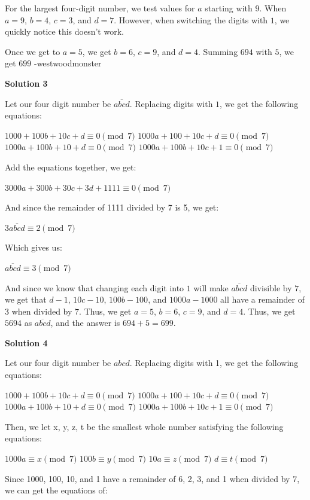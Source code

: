 \begin{enumerate}
 For the largest four-digit number, we test values for $a$ starting with $9$. When $a = 9$, $b = 4$, $c = 3$, and $d = 7$.  However, when switching the digits with $1$, we quickly notice this doesn't work. 

 Once we get to $a = 5$, we get $b=6$, $c=9$, and $d=4$. Summing $694$ with $5$, we get $\boxed{699}$ -westwoodmonster

 



\textbf{Solution 3}

Let our four digit number be $\overline{abcd}$. Replacing digits with $1$, we get the following equations:

 $1000+100b+10c+d \equiv 0 \pmod{7}$
$1000a+100+10c+d \equiv 0 \pmod{7}$
$1000a+100b+10+d \equiv 0 \pmod{7}$
$1000a+100b+10c+1 \equiv 0 \pmod{7}$

 Add the equations together, we get:

 $3000a+300b+30c+3d+1111 \equiv 0 \pmod{7}$

 And since the remainder of 1111 divided by 7 is 5, we get:

 $3\overline{abcd} \equiv 2 \pmod{7}$

 Which gives us:

 $\overline{abcd} \equiv 3 \pmod{7}$

 And since we know that changing each digit into $1$ will make $\overline{abcd}$ divisible by $7$, we get that $d-1$, $10c-10$, $100b-100$, and $1000a-1000$ all have a remainder of $3$ when divided by $7$. Thus, we get $a=5$, $b=6$, $c=9$, and $d=4$. Thus, we get $5694$ as $\overline{abcd}$, and the answer is $694+5=\boxed{699}$.

 



\textbf{Solution 4}

Let our four digit number be $abcd$. Replacing digits with 1, we get the following equations:

 $1000+100b+10c+d \equiv 0 \pmod{7}$
$1000a+100+10c+d \equiv 0 \pmod{7}$
$1000a+100b+10+d \equiv 0 \pmod{7}$
$1000a+100b+10c+1 \equiv 0 \pmod{7}$

 Then, we let x, y, z, t be the smallest whole number satisfying the following equations:

 $1000a \equiv x \pmod{7}$
$100b \equiv y \pmod{7}$
$10a \equiv z \pmod{7}$
$d \equiv t \pmod{7}$

 Since 1000, 100, 10, and 1 have a remainder of 6, 2, 3, and 1 when divided by 7, we can get the equations of:


\end{enumerate}
